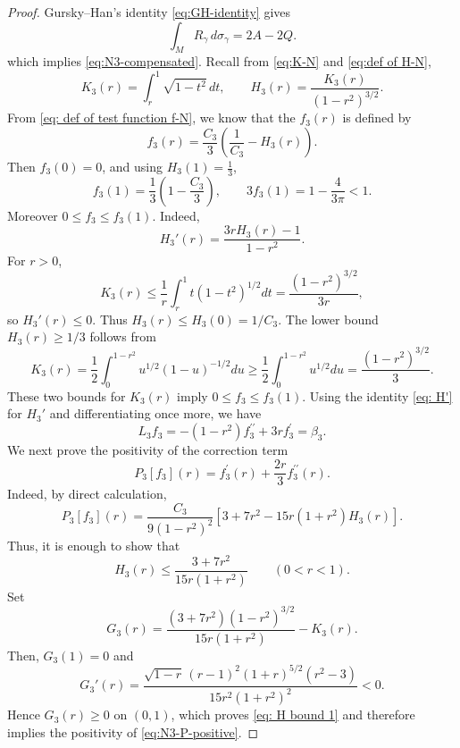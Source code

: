 \documentclass[11pt,letterpaper]{amsart}
\theoremstyle{definition}
\theoremstyle{remark}
\numberwithin{equation}{section}
\begin{document}
\begin{proof}
Gursky--Han's identity \eqref{eq:GH-identity} gives
\begin{equation}\label{eq:N3-GH}
 \int_MR_\gamma\,d\sigma_\gamma=2A-2Q.
\end{equation}
which implies \eqref{eq:N3-compensated}.
Recall from \eqref{eq:K-N} and \eqref{eq:def of H-N}, 
\[
K_3(r)=\int_r^1\sqrt{1-t^2}\,dt,
 \qquad
 H_3(r)=\frac{K_3(r)}{(1-r^2)^{3/2}}.
\]
From \eqref{eq: def of test function f-N}, we know that the $f_3(r)$ is defined by
\begin{equation}\label{eq:N3-f}
 f_3(r)=\frac{C_3}{3}\left(\frac1{C_3}-H_3(r)\right).
\end{equation}
Then $f_3(0)=0$, and using $H_3(1)=\frac{1}{3}$,
\begin{equation}\label{eq:N3-f1}
 f_3(1)=\frac13\left(1-\frac{C_3}{3}\right),
 \qquad
 3f_3(1)=1-\frac4{3\pi}<1.
\end{equation}
Moreover $0\le f_3\le f_3(1)$.  Indeed,
\begin{equation}\label{eq: H'}
 H_3'(r)=\frac{3rH_3(r)-1}{1-r^2}.
\end{equation}
For $r>0$,
\[K_3(r) \leq \frac{1}{r} \int_r^1 t\left(1-t^2\right)^{1 / 2} d t=\frac{\left(1-r^2\right)^{3 / 2}}{3 r},\]
so $H_3'(r) \leq 0.$ Thus $H_3(r) \leq H_3(0)=1 / C_3$. The lower bound $H_3(r) \geq 1 / 3$ follows from
\[K_3(r)=\frac{1}{2} \int_0^{1-r^2} u^{1 / 2}(1-u)^{-1 / 2} d u \geq \frac{1}{2} \int_0^{1-r^2} u^{1 / 2} d u=\frac{\left(1-r^2\right)^{3 / 2}}{3}.\]
These two bounds for $K_3(r)$  imply $0\le f_3\le f_3(1)$.
Using the identity \eqref{eq: H'} for $H_3'$ and differentiating once more, we have
\begin{equation}\label{eq:N3-Lf}
L_3 f_3=-\left(1-r^2\right) f_3^{\prime \prime}+3 r f_3^{\prime}=\beta_3.
\end{equation}
We next prove the positivity of the correction term
\begin{equation}\label{eq:N3-P-positive}
P_3[f_3](r)=f_3^{\prime}(r)+\frac{2 r}{3} f_3^{\prime \prime}(r).
\end{equation}
Indeed, by direct calculation,
\[
 P_3[f_3](r)=\frac{C_3}{9(1-r^2)^2}
 \left[3+7r^2-15r(1+r^2)H_3(r)\right].
\]
Thus, it is enough to show that
\begin{equation}\label{eq: H bound 1}
H_3(r)\le\frac{3+7r^2}{15r(1+r^2)} \qquad (0<r<1).
\end{equation}
Set
\[
 G_3(r)=\frac{(3+7r^2)(1-r^2)^{3/2}}{15r(1+r^2)}-K_3(r).
\]
Then, $G_3(1)=0$ and
\[
 G_3'(r)=
 \frac{\sqrt{1-r}\,(r-1)^2(1+r)^{5/2}(r^2-3)}
 {15r^2(1+r^2)^2}<0.
\]
Hence $G_3(r)\ge0$ on $(0,1)$, which proves \eqref{eq: H bound 1} and therefore implies the positivity of \eqref{eq:N3-P-positive}.


\end{proof}
\end{document}
